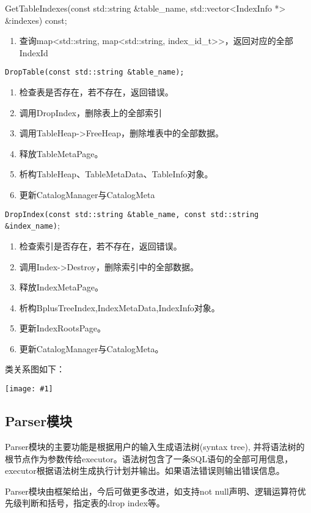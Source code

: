 \documentclass[12pt, a4paper]{article}
\def\c#1{\texttt{#1}}
\def\ss#1{\subsection{#1}}
\def\p{\par}
\def\g#1{\begin{center}\texttt{[image: \#1]}\end{center}}
\begin{document}
\begin{itemize}
{  \item GetTableIndexes(const std::string \&table\_name, std::vector<IndexInfo *> \&indexes) const;}\begin{enumerate}
    \item 查询map<std::string, map<std::string, index\_id\_t>>，返回对应的全部IndexId
  \end{enumerate}
  \item \c{DropTable(const std::string \&table\_name);}\begin{enumerate}
    \item 检查表是否存在，若不存在，返回错误。
    \item 调用DropIndex，删除表上的全部索引
    \item 调用TableHeap->FreeHeap，删除堆表中的全部数据。
    \item 释放TableMetaPage。
    \item 析构TableHeap、TableMetaData、TableInfo对象。
    \item 更新CatalogManager与CatalogMeta
  \end{enumerate}
  \item \c{DropIndex(const std::string \&table\_name, const std::string \&index\_name)};\begin{enumerate}
    \item 检查索引是否存在，若不存在，返回错误。
    \item 调用Index->Destroy，删除索引中的全部数据。
    \item 释放IndexMetaPage。
    \item 析构BplusTreeIndex,IndexMetaData,IndexInfo对象。
    \item 更新IndexRootsPage。
    \item 更新CatalogManager与CatalogMeta。
  \end{enumerate}
\end{itemize}
\p 类关系图如下：
\g{dots/catalog_manager.pdf}

\ss{Parser模块}
\p Parser模块的主要功能是根据用户的输入生成语法树(syntax tree), 并将语法树的根节点作为参数传给executor。语法树包含了一条SQL语句的全部可用信息， executor根据语法树生成执行计划并输出。如果语法错误则输出错误信息。
\p Parser模块由框架给出，今后可做更多改进，如支持not null声明、逻辑运算符优先级判断和括号，指定表的drop index等。
\end{document}
